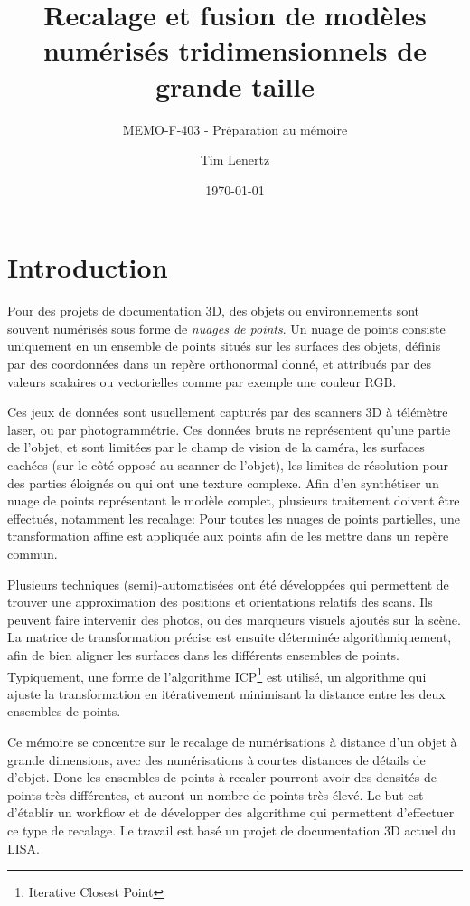 \documentclass[a4paper,10pt]{scrreprt}
\begin{document}
\title{Recalage et fusion de modèles numérisés tridimensionnels de grande taille}
\subtitle{MEMO-F-403 - Préparation au mémoire}
\author{Tim Lenertz}
\date{\today}
\maketitle

\tableofcontents

\chapter{Introduction}
Pour des projets de documentation 3D, des objets ou environnements sont souvent numérisés sous forme de \emph{nuages de points}. Un nuage de points consiste uniquement en un ensemble de points situés sur les surfaces des objets, définis par des coordonnées dans un repère orthonormal donné, et attribués par des valeurs scalaires ou vectorielles comme par exemple une couleur RGB.

Ces jeux de données sont usuellement capturés par des scanners 3D à télémètre laser, ou par photogrammétrie. Ces données bruts ne représentent qu'une partie de l'objet, et sont limitées par le champ de vision de la caméra, les surfaces cachées (sur le côté opposé au scanner de l'objet), les limites de résolution pour des parties éloignés ou qui ont une texture complexe. Afin d'en synthétiser un nuage de points représentant le modèle complet, plusieurs traitement doivent être effectués, notamment les recalage: Pour toutes les nuages de points partielles, une transformation affine est appliquée aux points afin de les mettre dans un repère commun.

Plusieurs techniques (semi)-automatisées ont été développées qui permettent de trouver une approximation des positions et orientations relatifs des scans. Ils peuvent faire intervenir des photos, ou des marqueurs visuels ajoutés sur la scène. La matrice de transformation précise est ensuite déterminée algorithmiquement, afin de bien aligner les surfaces dans les différents ensembles de points. Typiquement, une forme de l'algorithme ICP\footnote{Iterative Closest Point} est utilisé, un algorithme qui ajuste la transformation en itérativement minimisant la distance entre les deux ensembles de points.

Ce mémoire se concentre sur le recalage de numérisations à distance d'un objet à grande dimensions, avec des numérisations à courtes distances de détails de d'objet. Donc les ensembles de points à recaler pourront avoir des densités de points très différentes, et auront un nombre de points très élevé. Le but est d'établir un workflow et de développer des algorithme qui permettent d'effectuer ce type de recalage. Le travail est basé un projet de documentation 3D actuel du LISA. 
\end{document}
